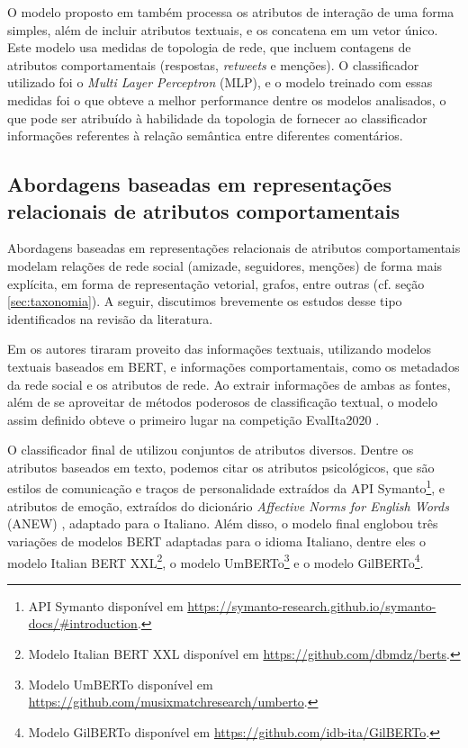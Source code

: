 \documentclass[
	12pt, oneside, a4paper, english, brazil
]{abntex2ppgsi}
\begin{document}
O modelo proposto em  também processa os atributos de interação de uma forma simples, além de incluir atributos textuais, e os concatena em um vetor único. Este modelo usa medidas de topologia de rede, que incluem contagens de atributos comportamentais (respostas, {\em retweets} e menções). O classificador utilizado foi o {\em Multi Layer Perceptron} (MLP), e o modelo treinado com essas medidas foi o que obteve a melhor performance dentre os modelos analisados, o que pode ser atribuído à habilidade da topologia de fornecer ao classificador informações referentes à relação semântica entre diferentes comentários.


\subsection{Abordagens baseadas em representações relacionais de atributos comportamentais}

Abordagens baseadas em representações relacionais de atributos comportamentais modelam relações de rede social (amizade, seguidores, menções) de forma mais explícita, em forma de representação vetorial, grafos, entre outras (cf. seção \ref{sec:taxonomia}). A seguir, discutimos brevemente os estudos desse tipo identificados na revisão da literatura.

Em  os autores tiraram proveito das informações textuais, utilizando modelos textuais baseados em BERT, e informações comportamentais, como os metadados da rede social e os atributos de rede. Ao extrair informações de ambas as fontes, além de se aproveitar de métodos poderosos de classificação textual, o modelo assim definido obteve o primeiro lugar na competição EvalIta2020 \cite{cignarella2020}. 

O classificador final de  utilizou conjuntos de atributos diversos. Dentre os atributos baseados em texto, podemos citar os atributos psicológicos, que são estilos de comunicação e traços de personalidade extraídos da API Symanto\footnote{API Symanto disponível em \url{https://symanto-research.github.io/symanto-docs/\#introduction}.}, e atributos de emoção, extraídos do dicionário {\em Affective Norms for English Words} (ANEW) \cite{anew}, adaptado para o Italiano. Além disso, o modelo final englobou três variações de modelos BERT adaptadas para o idioma Italiano, dentre eles o modelo Italian BERT XXL\footnote{Modelo Italian BERT XXL disponível em \url{https://github.com/dbmdz/berts}.}, o modelo UmBERTo\footnote{Modelo UmBERTo disponível em \url{https://github.com/musixmatchresearch/umberto}.} e o modelo GilBERTo\footnote{Modelo GilBERTo disponível em \url{https://github.com/idb-ita/GilBERTo}.}.
\end{document}
